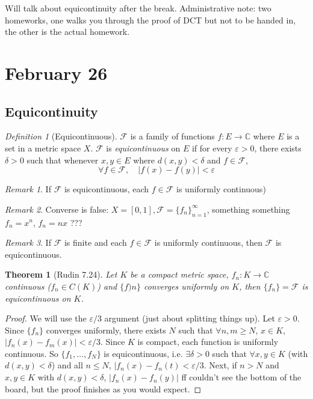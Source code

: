 \documentclass{article}
\theoremstyle{plain}
\newtheorem{theorem}{Theorem}
\theoremstyle{remark}
\newtheorem{definition}{Definition}
\newtheorem{remark}{Remark}
\newcommand{\C}{{\mathbb C}}
\newcommand{\ep}{{\varepsilon}}
\begin{document}
Will talk about equicontinuity after the break.
Administrative note: two homeworks,
one walks you through the proof of DCT but not to be handed in,
the other is the actual homework.


\section{February 26}
\subsection{Equicontinuity}
\begin{definition}[Equicontinuous]
	$\mathcal{F}$ is a family of functions $f \colon E \to \C$
	where $E$ is a set in a metric space $X$.
	$\mathcal{F}$ is \emph{equicontinuous} on $E$ if for every $\ep > 0$,
	there exists $\delta > 0$ such that whenever $x,y \in E$ where
	$d(x,y) < \delta$ and $f \in \mathcal{F}$,
	\[
		\forall f \in \mathcal{F}, \quad \lvert f(x) - f(y)\rvert < \ep
	\]
\end{definition}
\begin{remark}
	If $\mathcal{F}$ is equicontinuous, each $f \in \mathcal{F}$ is uniformly continuous)
\end{remark}
\begin{remark}
	Converse is false: $X = [0,1], \mathcal{F} = \{f_n\}_{n=1}^\infty$, 
	something something $f_n = x^n$, $f_n = nx$ ???
\end{remark}
\begin{remark}
	If $\mathcal{F}$ is finite and each $f \in \mathcal{F}$ is uniformly continuous,
	then $\mathcal{F}$ is equicontinuous.
\end{remark}

\begin{theorem}[Rudin 7.24]
	Let $K$ be a compact metric space,
	$f_n \colon K \to \C$ continuous ($f_n \in C(K)$)
	and $\{f)n\}$ converges uniformly on $K$,
	then $\{f_n\} = \mathcal{F}$ is equicontinuous on $K$.
\end{theorem}
\begin{proof}
	We will use the $\ep/3$ argument (just about splitting things up).
	Let $\ep > 0$.
	Since $\{f_n\}$ converges uniformly,
	there exists $N$ such that $\forall n,m \geq N$, $x \in K$,
	$\lvert f_n(x) - f_m(x) \rvert < \ep/3$.
	Since $K$ is compact, each function is uniformly continuous.
	So $\{f_1,\dots,f_N\}$ is equicontinuous,
	i.e. $\exists \delta > 0$ such that $\forall x,y \in K$ (with $d(x,y) < \delta$)
	and all $n \leq N$,
	$\lvert f_n(x) - f_n(t) < \ep/3$.
	Next, if $n > N$ and $x,y \in K$ with $d(x,y) < \delta$,
	$\lvert f_n(x) - f_n(y) \rvert$
	ff couldn't see the bottom of the board,
	but the proof finishes as you would expect.
\end{proof}
\end{document}
